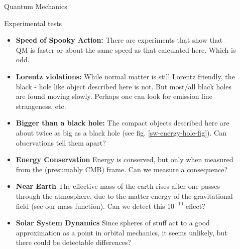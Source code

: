\documentclass[final]{beamer}
\newlength{\sepwidth}
\newlength{\colwidth}
\newcommand{\separatorcolumn}{\begin{column}{\sepwidth}\end{column}}
\begin{document}
\begin{frame}[t]
\begin{columns}[t]
\begin{column}{\colwidth}
\begin{block}{Quantum Mechanics}
\begin{exampleblock}{Experimental tests}
 \begin{itemize}
      \item \textbf{Speed of Spooky Action:} There are  experiments that show that QM is faster or about the same speed as that calculated here. Which is odd. 
      \item \textbf{Lorentz violations:} While normal matter is still Lorentz friendly, the black - hole like object described here is not. But most/all black holes are found moving slowly. Perhaps one can look for emission line strangeness, etc.
      \item \textbf{Bigger than a black hole:} The compact objects described here are about twice as big as a black hole (see fig. \ref{sw-energy-hole-fig}). Can observations tell them apart?
      \item \textbf{Energy Conservation} Energy is conserved, but only when measured from the (presumably CMB) frame. Can we measure a consequence?
      \item \textbf{Near Earth} The effective mass of the earth rises after one passes through the atmosphere, due to the matter energy of the gravitational field (see our mass function). Can we detect this $10^{-10}$ effect?
      \item \textbf{Solar System Dynamics} Since spheres of stuff act to a good approximation as a point in orbital mechanics, it seems unlikely, but there could be detectable differences?
       
\end{itemize}
\end{exampleblock} 
   
\end{block}



\end{column}
\separatorcolumn

\begin{column}{\colwidth}


\end{column}
\end{columns}
\end{frame}
\end{document}
